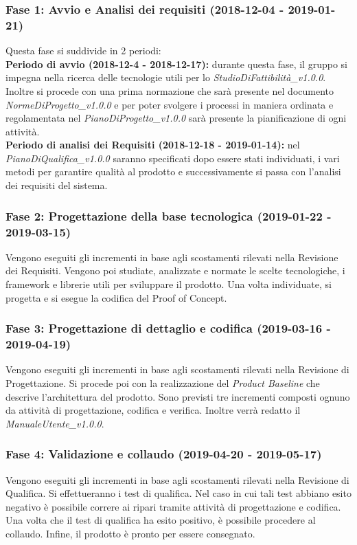 \subsubsection{Fase 1: Avvio e Analisi dei requisiti (2018-12-04 - 2019-01-21)} 
Questa fase si suddivide in 2 periodi: \\
\textbf{Periodo di avvio (2018-12-4 - 2018-12-17):} 
durante questa fase, il gruppo si impegna nella ricerca delle tecnologie utili per lo \textit{StudioDiFattibilità\_v1.0.0}. Inoltre si procede con una prima normazione che sarà presente nel documento \textit{NormeDiProgetto\_v1.0.0} e per poter svolgere i processi in maniera ordinata e regolamentata nel \textit{PianoDiProgetto\_v1.0.0} sarà presente la pianificazione di ogni attività.\\
\textbf{Periodo di analisi dei Requisiti (2018-12-18 - 2019-01-14):} nel \textit{PianoDiQualifica\_v1.0.0} saranno specificati dopo essere stati individuati, i vari metodi per garantire qualità al prodotto e successivamente si passa con l'analisi dei requisiti del sistema.

\subsubsection{Fase 2: Progettazione della base tecnologica (2019-01-22 - 2019-03-15)}
Vengono eseguiti gli incrementi in base agli scostamenti rilevati nella Revisione dei Requisiti.
Vengono poi studiate, analizzate e normate le scelte tecnologiche, i framework e librerie utili per sviluppare il prodotto. Una volta individuate, si progetta e si esegue la codifica del Proof of Concept.\\

\subsubsection{Fase 3: Progettazione di dettaglio e codifica (2019-03-16 - 2019-04-19)}
Vengono eseguiti gli incrementi in base agli scostamenti rilevati nella Revisione di Progettazione.
Si procede poi con la realizzazione del \textit{Product Baseline} che descrive l'architettura del prodotto.
Sono previsti tre incrementi composti ognuno da attività di progettazione, codifica e verifica.
Inoltre verrà redatto il \textit{ManualeUtente\_v1.0.0}.\\

\subsubsection{Fase 4: Validazione e collaudo (2019-04-20 - 2019-05-17)}
Vengono eseguiti gli incrementi in base agli scostamenti rilevati nella Revisione di Qualifica.
Si effettueranno i test di qualifica. Nel caso in cui tali test abbiano esito negativo è possibile correre ai ripari tramite attività di progettazione e codifica. Una volta che il test di qualifica ha esito positivo, è possibile procedere al collaudo.
Infine, il prodotto è pronto per essere consegnato.

